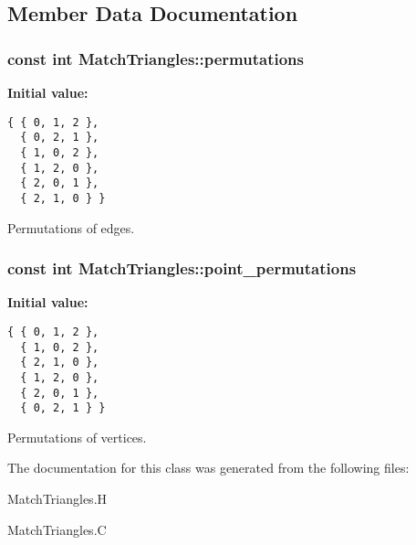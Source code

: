 \subsection{Member Data Documentation}
\subsubsection{\setlength{\rightskip}{0pt plus 5cm}const int \bf{Match\-Triangles::permutations}\hspace{0.3cm}{\tt  [static, private]}}\label{classSimSite3D_1_1MatchTriangles_ef9e8c25707ff5d109fc2f93d00be198}


\textbf{Initial value:}

\begin{Code}\begin{verbatim} 
{ { 0, 1, 2 },
  { 0, 2, 1 },
  { 1, 0, 2 },
  { 1, 2, 0 },
  { 2, 0, 1 },
  { 2, 1, 0 } }
\end{verbatim}\end{Code}
Permutations of edges. 

\subsubsection{\setlength{\rightskip}{0pt plus 5cm}const int \bf{Match\-Triangles::point\_\-permutations}\hspace{0.3cm}{\tt  [static, private]}}\label{classSimSite3D_1_1MatchTriangles_5249b60afc22af79841be9345cf6c98e}


\textbf{Initial value:}

\begin{Code}\begin{verbatim} 
{ { 0, 1, 2 },
  { 1, 0, 2 },
  { 2, 1, 0 },
  { 1, 2, 0 },
  { 2, 0, 1 },
  { 0, 2, 1 } }
\end{verbatim}\end{Code}
Permutations of vertices. 



The documentation for this class was generated from the following files:\begin{CompactItemize}
\item 
Match\-Triangles.H\item 
Match\-Triangles.C\end{CompactItemize}
